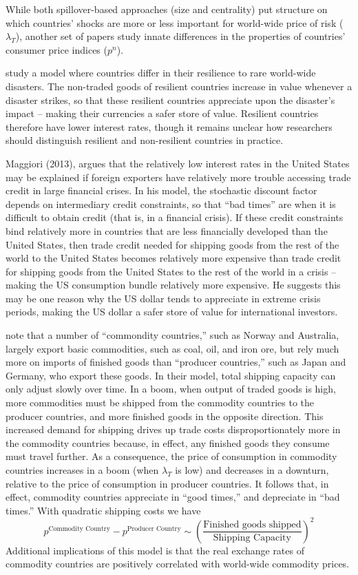 \documentclass{ar-1col}
\begin{document}
While both spillover-based approaches (size and centrality) put structure on which countries' shocks are more or less important for world-wide price of risk ($\lambda_T$), another set of papers study innate differences in the properties of countries' consumer price indices ($p^n$). 

\citet{FarhiGabaix2016} study a model where countries differ in their resilience to rare world-wide disasters. The non-traded goods of resilient countries increase in value whenever a disaster strikes, so that these resilient countries appreciate upon the disaster's impact -- making their currencies a safer store of value. Resilient countries therefore have lower interest rates, though it remains unclear how researchers should distinguish resilient and non-resilient countries in practice. 

Maggiori (2013), argues that the relatively low interest rates in the United States may be explained if foreign exporters have relatively more trouble accessing trade credit in large financial crises. In his model, the stochastic discount factor depends on intermediary credit constraints, so that ``bad times'' are when it is difficult to obtain credit (that is, in a financial crisis). If these credit constraints bind relatively more in countries that are less financially developed than the United States, then trade credit needed for shipping goods from the rest of the world to the United States becomes relatively more expensive than trade credit for shipping goods from the United States to the rest of the world in a crisis -- making the US consumption bundle relatively more expensive. He suggests this may be one reason why the US dollar tends to appreciate in extreme crisis periods, making the US dollar a safer store of value for international investors.

\citet{Readyetal2013} note that a number of ``commondity countries,'' such as Norway and Australia, largely export basic commodities, such as coal, oil, and iron ore, but rely much more on imports of finished goods than ``producer countries,'' such as Japan and Germany, who export these goods. In their model, total shipping capacity can only adjust slowly over time. In a boom, when output of traded goods is high, more commodities must be shipped from the commodity countries to the producer countries, and more finished goods in the opposite direction. This increased demand for shipping drives up trade costs disproportionately more in the commodity countries because, in effect, any finished goods they consume must travel further. As a consequence, the price of consumption in commodity countries increases in a boom (when $\lambda_T$ is low) and decreases in a downturn, relative to the price of consumption in producer countries. It follows that, in effect, commodity countries appreciate in ``good times,'' and depreciate in ``bad times.'' With quadratic shipping costs we have $$p^{\text{Commodity Country}}-p^{\text{Producer Country}}\sim\left(\frac{\text{Finished goods shipped}}{\text{Shipping Capacity}}\right)^2 $$
Additional implications of this model is that the real exchange rates of commodity countries are positively correlated with world-wide commodity prices. 
\end{document}

